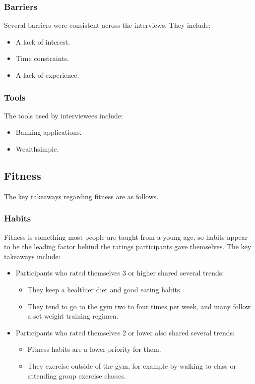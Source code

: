 \documentclass[12pt]{article}
\begin{document}
\subsubsection{Barriers}
Several barriers were consistent across the interviews. They include:
\begin{itemize}
    \item A lack of interest.
    \item Time constraints.
    \item A lack of experience.
\end{itemize}

\subsubsection{Tools}
The tools used by interviewees include:
\begin{itemize}
    \item Banking applications.
    \item Wealthsimple.
\end{itemize}

\subsection{Fitness}
The key takeaways regarding fitness are as follows.

\subsubsection{Habits}
Fitness is something most people are taught from a young age, so habits appear to be the leading factor behind the ratings participants gave themselves. The key takeaways include:
\begin{itemize}
    \item Participants who rated themselves 3 or higher shared several trends:
    \begin{itemize}
        \item They keep a healthier diet and good eating habits.
        \item They tend to go to the gym two to four times per week, and many follow a set weight training regimen.
    \end{itemize}
    \item Participants who rated themselves 2 or lower also shared several trends:
    \begin{itemize}
        \item Fitness habits are a lower priority for them.
        \item They exercise outside of the gym, for example by walking to class or attending group exercise classes.
    \end{itemize}
\end{itemize}
\end{document}
